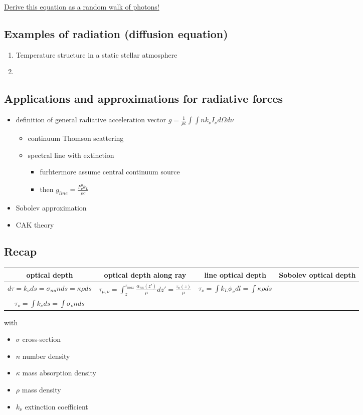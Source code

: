 \documentclass[../main/main.tex]{subfiles}
\begin{document}
\underline{Derive this equation as a random walk of photons!}

\subsection{Examples of radiation (diffusion equation)}
\begin{enumerate}
\item Temperature structure in a static stellar atmosphere
\item 
\end{enumerate}

\subsection{Applications and approximations for radiative forces}
\begin{itemize}
\item definition of general radiative acceleration vector $g = \frac{1}{\rho c}\int \int n k_{\nu} I_{\nu} d\Omega d\nu$
\begin{itemize}
\item continuum Thomson scattering
\item spectral line with extinction
\begin{itemize}
\item furhtermore assume central continuum source
\item then $g_{line} = \frac{F_{\nu}^0 k_L}{\rho c}$
\end{itemize}
\end{itemize}

\item Sobolev approximation
\item CAK theory
\end{itemize}

\subsection{Recap}
\begin{center}
\centering
{\tabulinesep=1.5mm
\begin{tabu}{|c|c|c|c|}
\hline 
optical depth 
	& optical depth along ray 
	& line optical depth 
	& Sobolev optical depth \\ \hline
$d\tau = k_{\nu}ds = \sigma_{nu}n ds = \kappa \rho ds$ 
	& $\tau_{\mu,\nu} = \int_z^{z_{max}} \frac{\alpha_{nu}(z')}{\mu}dz' = \frac{\tau_{\nu}(z)}{\mu}$ 
	& $\tau_{\nu} = \int k_L \phi_{\nu} dl = \int \kappa \rho ds$ \\ 
$\tau_{\nu} = \int k_{\nu}ds = \int \sigma_{\nu} n ds$ & \\ \hline
\end{tabu}}
\end{center}
with \begin{itemize}
\item $\sigma$ cross-section
\item $n$ number density
\item $\kappa$ mass absorption density
\item $\rho$ mass density
\item $k_{\nu}$ extinction coefficient
\end{itemize}
\end{document}
